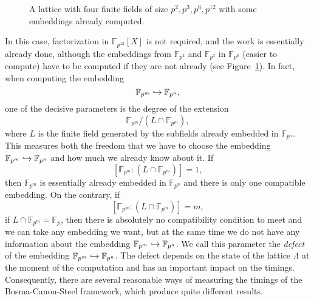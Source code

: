 \begin{figure}[h]
  \centering
  \caption{A lattice with four finite fields of size $p^2, p^3, p^6,
    p^{12}$ with some embeddings already computed.}
  \label{fig:example-F12}
\end{figure}
In this case, factorization in $\mathbb{F}_{p^{12}}[X]$ is not required, and the
work is essentially already done, although the embeddings from
$\mathbb{F}_{p^{2}}$ and $\mathbb{F}_{p^{3}}$ in $\mathbb{F}_{p^{6}}$ (easier
to compute) have to be computed if they are not already (see
Figure~\ref{fig:example-F12}).
In fact, when computing the embedding
\[
  \mathbb{F}_{p^{m}}\hookrightarrow\mathbb{F}_{p^{n}},
\]
one of the decisive parameters is the degree of the extension 
\[
  \mathbb{F}_{p^{m}}/(L\cap\mathbb{F}_{p^{m}}),
\]
where $L$ is the finite field generated by the subfields already embedded in
$\mathbb{F}_{p^{n}}$. This measures both the freedom that we have to choose the
embedding $\mathbb{F}_{p^{m}}\hookrightarrow\mathbb{F}_{p^{n}}$ and how much we already
know about it. If
\[
  \left[ \mathbb{F}_{p^{m}}:(L\cap\mathbb{F}_{p^{m}})\right]=1,
\]
then $\mathbb{F}_{p^{m}}$ is essentially already embedded in
$\mathbb{F}_{p^{n}}$ and there is only one compatible embedding. On the
contrary, if 
\[
  \left[ \mathbb{F}_{p^{m}}:(L\cap\mathbb{F}_{p^{m}})\right]=m,
\]
\ie if $L\cap\mathbb{F}_{p^{m}}=\mathbb{F}_p$, then there is absolutely no
compatibility condition to meet and we can take any embedding we want, but at
the same time we do not have any information about the embedding
$\mathbb{F}_{p^{m}}\hookrightarrow\mathbb{F}_{p^{n}}$. We call this parameter the
\emph{defect} of the embedding $\mathbb{F}_{p^{m}}\hookrightarrow\mathbb{F}_{p^{n}}$.
The defect depends on the state of the lattice $\Lambda$ at the moment of the
computation and has an important impact on the timings.
Consequently, there are several reasonable ways of measuring the timings
of the Bosma-Canon-Steel framework, which produce quite different results.
